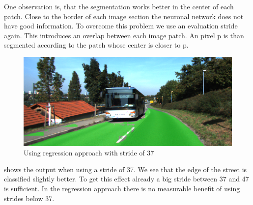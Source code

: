 One observation is, that the segmentation works better in the center of each patch. Close to the border of each image section the neuronal network does not have good information. To overcome this problem we use an evaluation stride again. This introduces an overlap between each image patch. An pixel p is than segmented according to the patch whose center is closer to p.




\begin{figure}[H]
	\centering
	\includegraphics[width=\columnwidth]{figures/models/testing2-um_32_conv_stride37.png}
	\caption{Using regression approach with stride of 37}
	\label{fig:reg_stride37}
\end{figure} 

 shows the output when using a stride of 37. We see that the edge of the street is classified slightly better. To get this effect already a big stride between 37 and 47 is sufficient. In the regression approach there is no measurable benefit of using strides below 37.  

